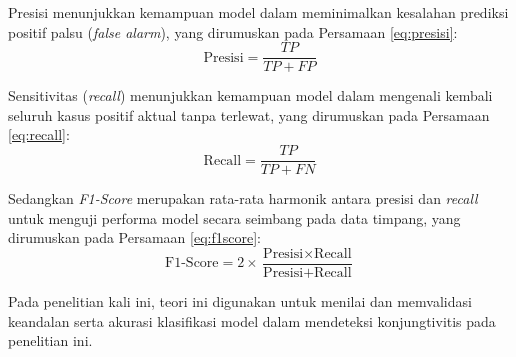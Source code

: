Presisi menunjukkan kemampuan model dalam meminimalkan kesalahan prediksi positif palsu (\textit{false alarm}), yang dirumuskan pada Persamaan \ref{eq:presisi}:
\begin{equation}
  \label{eq:presisi}
  \text{Presisi} = \frac{TP}{TP + FP}
\end{equation}

Sensitivitas (\textit{recall}) menunjukkan kemampuan model dalam mengenali kembali seluruh kasus positif aktual tanpa terlewat, yang dirumuskan pada Persamaan \ref{eq:recall}:
\begin{equation}
  \label{eq:recall}
  \text{Recall} = \frac{TP}{TP + FN}
\end{equation}

Sedangkan \textit{F1-Score} merupakan rata-rata harmonik antara presisi dan \textit{recall} untuk menguji performa model secara seimbang pada data timpang, yang dirumuskan pada Persamaan \ref{eq:f1score}:
\begin{equation}
  \label{eq:f1score}
  \text{F1-Score} = 2 \times \frac{\text{Presisi} \times \text{Recall}}{\text{Presisi} + \text{Recall}}
\end{equation}

Pada penelitian kali ini, teori ini digunakan untuk menilai dan memvalidasi keandalan serta akurasi klasifikasi model dalam mendeteksi konjungtivitis pada penelitian ini.
